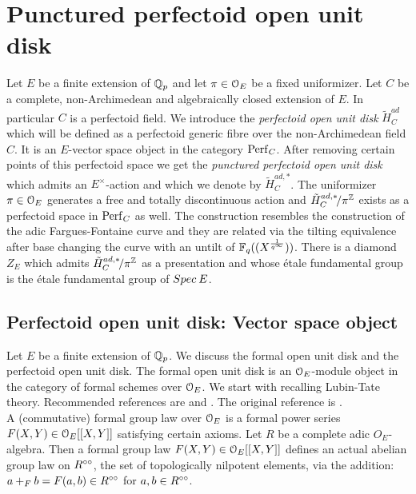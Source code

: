 \chapter{Punctured perfectoid open unit disk}
Let $E$ be a finite extension of $\mathbb{Q}_p$ and let $\pi\in\mathcal{O}_E$ be a fixed uniformizer.
Let $C$ be a complete, non-Archimedean and algebraically closed extension of $E$. In particular $C$ is a perfectoid field.
We introduce the \emph{perfectoid open unit disk} $\widetilde{H}_{C}^{ad}$ which will be defined as a perfectoid generic fibre over the non-Archimedean field $C$. It is an $E$-vector space object in the category $\mathrm{Perf}_{C}$. After removing certain points of this perfectoid space we get the \emph{punctured perfectoid open unit disk} which admits an $E^{\times}$-action and which we denote by $\widetilde{H}_{C}^{ad, *}$. The uniformizer   $\pi\in\mathcal{O}_E$ generates a free and totally discontinuous action and $\tilde{H}^{ad, *}_{C}\!/\pi^{\mathbb{Z}}$ exists as a perfectoid space in $\mathrm{Perf}_{C}$ as well. 
The construction resembles the construction of the adic Fargues-Fontaine curve and they are related via the tilting equivalence after base changing the curve with an untilt of $\mathbb{F}_q((X^{\frac{1}{q^\infty}}))$. There is a diamond $Z_E$ which admits $\tilde{H}^{ad, *}_{C}\!/\pi^{\mathbb{Z}}$ as a presentation and whose \'{e}tale fundamental group is the \'{e}tale fundamental group of ${Spec{\:E}}$.
 

\section{Perfectoid open unit disk: Vector space object}

Let $E$ be a finite extension of $\mathbb{Q}_p$.
We discuss the formal open unit disk and the perfectoid open unit disk. The formal open unit disk is an $\mathcal{O}_E$-module object in the category of formal schemes over $\mathcal{O}_E$.
We start with recalling Lubin-Tate theory. Recommended references are \cite{Lang78} and \cite{Hazewinkel78}. The original reference is \cite{LT65}.\\

A (commutative) formal group law over $\mathcal{O}_E$  is a formal power series $F(X,Y)\in\mathcal{O}_E[[X,Y]]$ satisfying certain axioms.
Let $R$ be a complete adic $O_E$-algebra. Then a formal group law $F(X,Y)\in\mathcal{O}_E[[X,Y]]$ defines an actual abelian group law on $R^{\circ\circ}$, the set of topologically nilpotent elements, via the addition:
$a+_{F} b = F(a,b)\in R^{\circ\circ}$ for $a,b\in R^{\circ\circ}$.\\
 
